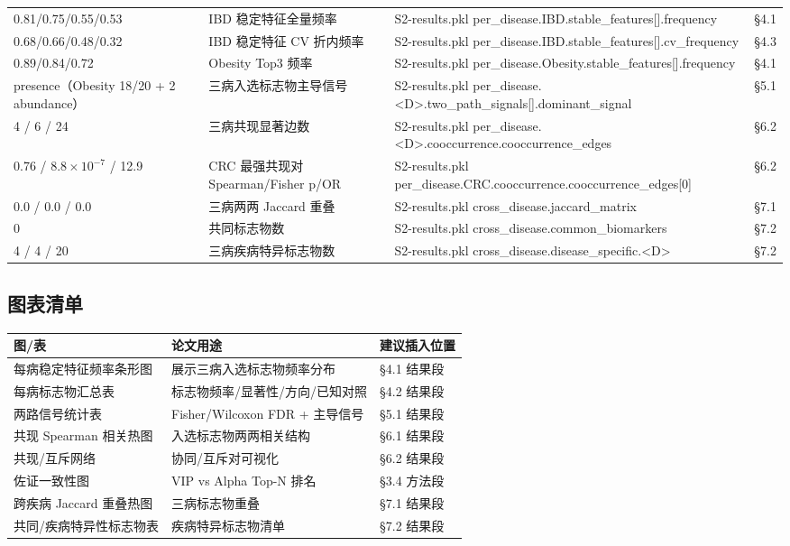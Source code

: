 \documentclass{article}   %
\begin{document}
\begin{center}
\begin{tabular}{llll}
0.81/0.75/0.55/0.53 & IBD 稳定特征全量频率 & S2-results.pkl per\_disease.IBD.stable\_features[].frequency & §4.1 \\
0.68/0.66/0.48/0.32 & IBD 稳定特征 CV 折内频率 & S2-results.pkl per\_disease.IBD.stable\_features[].cv\_frequency & §4.3 \\
0.89/0.84/0.72 & Obesity Top3 频率 & S2-results.pkl per\_disease.Obesity.stable\_features[].frequency & §4.1 \\
presence（Obesity 18/20 + 2 abundance） & 三病入选标志物主导信号 & S2-results.pkl per\_disease.<D>.two\_path\_signals[].dominant\_signal & §5.1 \\
4 / 6 / 24 & 三病共现显著边数 & S2-results.pkl per\_disease.<D>.cooccurrence.cooccurrence\_edges & §6.2 \\
0.76 / $8.8\times10^{-7}$ / 12.9 & CRC 最强共现对 Spearman/Fisher p/OR & S2-results.pkl per\_disease.CRC.cooccurrence.cooccurrence\_edges[0] & §6.2 \\
0.0 / 0.0 / 0.0 & 三病两两 Jaccard 重叠 & S2-results.pkl cross\_disease.jaccard\_matrix & §7.1 \\
0 & 共同标志物数 & S2-results.pkl cross\_disease.common\_biomarkers & §7.2 \\
4 / 4 / 20 & 三病疾病特异标志物数 & S2-results.pkl cross\_disease.disease\_specific.<D> & §7.2 \\
\bottomrule
\end{tabular}
\end{center}

\subsection{图表清单}

\begin{center}
\footnotesize
\begin{tabular}{lll}
\toprule
图/表 & 论文用途 & 建议插入位置 \\
\midrule
每病稳定特征频率条形图 & 展示三病入选标志物频率分布 & §4.1 结果段 \\
每病标志物汇总表 & 标志物频率/显著性/方向/已知对照 & §4.2 结果段 \\
两路信号统计表 & Fisher/Wilcoxon FDR + 主导信号 & §5.1 结果段 \\
共现 Spearman 相关热图 & 入选标志物两两相关结构 & §6.1 结果段 \\
共现/互斥网络 & 协同/互斥对可视化 & §6.2 结果段 \\
佐证一致性图 & VIP vs Alpha Top-N 排名 & §3.4 方法段 \\
跨疾病 Jaccard 重叠热图 & 三病标志物重叠 & §7.1 结果段 \\
共同/疾病特异性标志物表 & 疾病特异标志物清单 & §7.2 结果段 \\
\bottomrule
\end{tabular}
\end{center}
\end{document}

